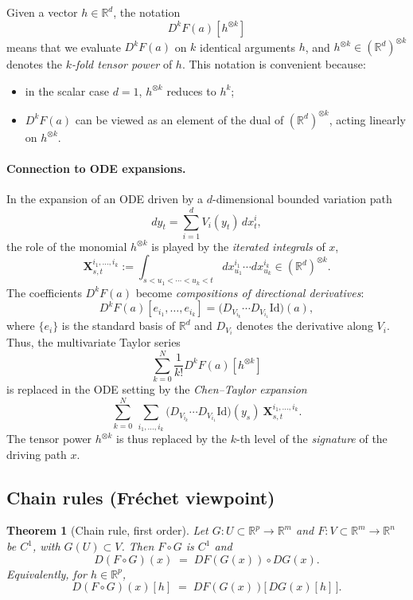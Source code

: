 \documentclass[12pt]{article}
\newtheorem{theorem}{Theorem}[section]
\begin{document}
Given a vector $h\in\mathbb{R}^d$, the notation
\[
D^kF(a)[h^{\otimes k}]
\]
means that we evaluate $D^kF(a)$ on $k$ identical arguments $h$, 
and $h^{\otimes k} \in (\mathbb{R}^d)^{\otimes k}$ denotes the 
\emph{$k$-fold tensor power} of $h$. 
This notation is convenient because:
\begin{itemize}
\item in the scalar case $d=1$, $h^{\otimes k}$ reduces to $h^k$;
\item $D^kF(a)$ can be viewed as an element of the dual of $(\mathbb{R}^d)^{\otimes k}$, 
acting linearly on $h^{\otimes k}$.
\end{itemize}

\paragraph{Connection to ODE expansions.}
In the expansion of an ODE driven by a $d$-dimensional bounded variation path
\[
dy_t = \sum_{i=1}^d V_i(y_t)\,dx_t^i,
\]
the role of the monomial $h^{\otimes k}$ is played by the 
\emph{iterated integrals} of $x$,
\[
\mathbf{X}^{i_1,\dots,i_k}_{s,t} 
:= \int_{s<u_1<\cdots<u_k<t} dx^{i_1}_{u_1} \cdots dx^{i_k}_{u_k} \in (\mathbb{R}^d)^{\otimes k}.
\]
The coefficients $D^kF(a)$ become \emph{compositions of directional derivatives}:
\[
D^kF(a)[e_{i_1},\dots,e_{i_k}] 
= \big(D_{V_{i_k}}\cdots D_{V_{i_1}}\mathrm{Id}\big)(a),
\]
where $\{e_i\}$ is the standard basis of $\mathbb{R}^d$ and $D_{V_i}$ denotes the derivative along $V_i$.
Thus, the multivariate Taylor series
\[
\sum_{k=0}^N \frac{1}{k!} D^kF(a)[h^{\otimes k}]
\]
is replaced in the ODE setting by the \emph{Chen--Taylor expansion}
\[
\sum_{k=0}^N \ \sum_{i_1,\dots,i_k} 
\big(D_{V_{i_k}}\cdots D_{V_{i_1}}\mathrm{Id}\big)(y_s) \ \mathbf{X}^{i_1,\dots,i_k}_{s,t}.
\]
The tensor power $h^{\otimes k}$ is thus replaced by the $k$-th level of the 
\emph{signature} of the driving path $x$.

\subsection{Chain rules (Fr\'echet viewpoint)}

\begin{theorem}[Chain rule, first order]
Let $G:U\subset\mathbb{R}^p\to\mathbb{R}^m$ and $F:V\subset\mathbb{R}^m\to\mathbb{R}^n$
be $C^1$, with $G(U)\subset V$. Then $F\circ G$ is $C^1$ and
\[
D(F\circ G)(x) \;=\; DF(G(x)) \circ DG(x).
\]
Equivalently, for $h\in\mathbb{R}^p$,
\[
D(F\circ G)(x)[h] \;=\; DF(G(x))\big[\,DG(x)[h]\,\big].
\]
\end{theorem}
\end{document}
